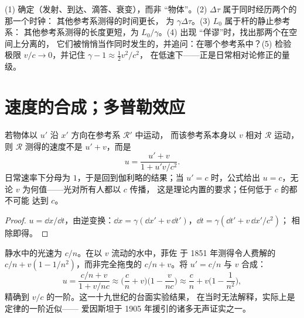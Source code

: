 \begin{method}[理清各种效应]\label{met:b3:relativistic-kinematics:method}
(1) 确定\emph{}（发射、到达、滴答、衰变），而非
“物体”。(2)  $\Delta\tau$ 属于同时经历两个的那一个时钟：
其他参考系测得的时间更长，
为 $\gamma\Delta\tau$。(3)  $L_0$ 属于杆的静止参考系：
其他参考系测得的长度更短，为 $L_0/\gamma$。(4) 出现
“佯谬”时，找出那两个在空间上分离的，
它们被悄悄当作同时发生的，并追问：在哪个参考系中？(5) 检验
极限 $v/c \to 0$，并记住 $\gamma - 1 \approx \tfrac12 v^2/c^2$，
在低速下——正是日常相对论修正的量级。
\end{method}

\section{速度的合成；多普勒效应}

\begin{proposition}[相对论速度合成]\label{prop:b3:relativistic-kinematics:addition}
若物体以 $u'$ 沿 $x'$ 方向在参考系 $\mathcal R'$ 中运动，
而该参考系本身以 $v$ 相对 $\mathcal R$ 运动，
则 $\mathcal R$ 测得的速度不是 $u' + v$，而是
\[
u = \frac{u' + v}{1 + u'v/c^2} .
\]
日常速率下分母为 $1$，于是回到伽利略的结果；当
$u' = c$ 时，公式给出 $u = c$，无论 $v$ 为何值——光对所有人都以 $c$ 传播，
这是理论内置的要求；任何低于 $c$ 的都不可能
达到 $c$。
\end{proposition}

\begin{proof}
$u = \dd x/\dd t$，由逆变换：$\dd x =
\gamma(\dd x' + v\,\dd t')$，$\dd t = \gamma(\dd t' + v\,\dd x'/c^2)$；
相除即得。
\end{proof}

\begin{example}[菲涅耳系数的解释]\label{ex:b3:relativistic-kinematics:fizeau}
静水中的光速为 $c/n$。在以 $v$ 流动的水中，菲佐
于 1851 年测得令人费解的 $c/n + v(1 - 1/n^2)$，而非完全拖曳的
$c/n + v$。将 $u' = c/n$ 与 $v$ 合成：
\[
u = \frac{c/n + v}{1 + v/nc}
\approx \Big(\frac{c}{n} + v\Big)\Big(1 - \frac{v}{nc}\Big)
\approx \frac{c}{n} + v\Big(1 - \frac{1}{n^2}\Big) ,
\]
精确到 $v/c$ 的一阶。这一十九世纪的台面实验结果，
在当时无法解释，实际上是定律的一阶近似——
爱因斯坦于 1905 年援引的诸多无声证实之一。
\end{example}

